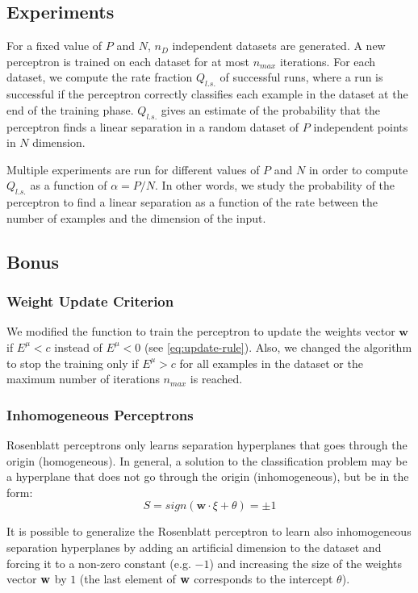\subsection{Experiments}
For a fixed value of $P$ and $N$, $n_D$ independent datasets are generated.
A new perceptron is trained on each dataset for at most $n_{max}$ iterations.
For each dataset, we compute the rate fraction $Q_{l.s.}$ of successful runs, where a run is successful if the perceptron correctly classifies each example in the dataset at the end of the training phase.
$Q_{l.s.}$ gives an estimate of the probability that the perceptron finds a linear separation in a random dataset of $P$ independent points in $N$ dimension.

Multiple experiments are run for different values of $P$ and $N$ in order to compute $Q_{l.s.}$ as a function of $\alpha = P / N$.
In other words, we study the probability of the perceptron to find a linear separation as a function of the rate between the number of examples and the dimension of the input.

\subsection{Bonus}
\subsubsection{Weight Update Criterion}
We modified the function to train the perceptron to update the weights vector $\mathsf{\bm{w}}$ if $E^\mu < c$ instead of $E^\mu < 0$ (see \cref{eq:update-rule}).
Also, we changed the algorithm to stop the training only if $E^{\mu} > c$ for all examples in the dataset or the maximum number of iterations $n_{max}$ is reached.

\subsubsection{Inhomogeneous Perceptrons}
Rosenblatt perceptrons only learns separation hyperplanes that goes through the origin (homogeneous).
In general, a solution to the classification problem may be a hyperplane that does not go through the origin (inhomogeneous), but be in the form:
\begin{equation}
    S = sign(\mathsf{\bm{w}} \cdot \xi + \theta) = \pm 1
\end{equation}

It is possible to generalize the Rosenblatt perceptron to learn also inhomogeneous separation hyperplanes by adding an artificial dimension to the dataset and forcing it to a non-zero constant (e.g. $-1$) and increasing the size of the weights vector $\mathsf{\bf{w}}$ by $1$ (the last element of $\mathsf{\bf{w}}$ corresponds to the intercept $\theta$).
